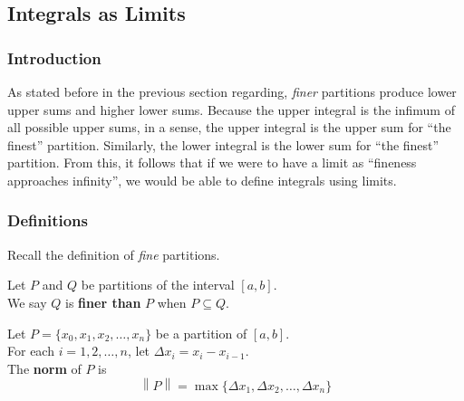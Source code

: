 \documentclass[11pt]{article}
\newenvironment{definition}[1][]{\begin{tcolorbox}[colframe=_orange,colback=_orange2,title=Definition. \ifthenelse{\isempty{#1}}{}{(#1)}
]}{\end{tcolorbox}}
\newcommand\norm[1]{\left\lVert#1\right\rVert}
\begin{document}
\subsection{Integrals as Limits}
\subsubsection{Introduction}
As stated before in the previous section regarding, \textit{finer} partitions produce lower upper sums and higher lower sums. Because the upper integral is the infimum of all possible upper sums, in a sense, the upper integral is the upper sum for ``the finest'' partition. Similarly, the lower integral is the lower sum for ``the finest'' partition. From this, it follows that if we were to have a limit as ``fineness approaches infinity'', we would be able to define integrals using limits.
\subsubsection{Definitions}
Recall the definition of \textit{fine} partitions.
\begin{definition}[Fine Partitions]
    Let $P$ and $Q$ be partitions of the interval $[a,b]$. \\
    We say $Q$ is \textbf{finer than} $P$ when $P\subseteq Q$.
\end{definition}
\begin{definition}[Norm of a Partition]
    Let $P=\{x_0,x_1,x_2,\dots,x_n\}$ be a partition of $[a,b]$. \\
    For each $i=1,2,\dots, n$, let $\Delta x_i=x_i-x_{i-1}$. \\
    The \textbf{norm} of $P$ is
    $$
        \norm{P}=\max\{\Delta x_1,\Delta x_2,\dots,\Delta x_n\}
    $$
\end{definition}
\end{document}

